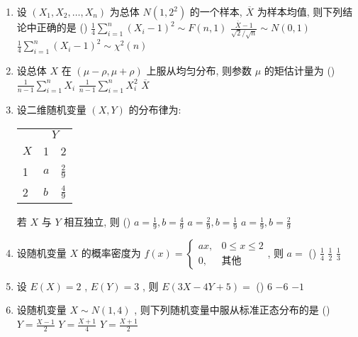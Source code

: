 \begin{enumerate}
	\item 设 $(X_1,X_2,\ldots,X_n)$ 为总体 $N\left(1,2^2\right)$ 的一个样本, $\overline X$ 为样本均值, 则下列结论中正确的是 (\hspace{1pc})
	{$\frac{1}{4}\sum_{i=1}^{n}(X_i-1)^2\sim F(n,1)$}
	{$\frac{\overline{X}-1}{\sqrt{2}/\sqrt{n}}\sim N(0,1)$}
	{$\frac{1}{4}\sum_{i=1}^{n}(X_i-1)^2\sim\chi^2(n)$}

	\item 设总体 $X$ 在 $(\mu-\rho,\mu+\rho)$ 上服从均匀分布, 则参数 $\mu$ 的矩估计量为 (\hspace{1pc})
	{$\frac{1}{n-1}\sum_{i=1}^{n}X_i$}
	{$\frac{1}{n-1}\sum_{i=1}^{n}X_i^2$}
	{$\overline{X}$}

	\item 设二维随机变量 $(X,Y)$ 的分布律为:
	\begin{center}
		\begin{tabularx}{0.8\textwidth}{ZZZ}
			\hline
			 & \\
			$X$ & 1 & 2\\
			 & $a$ & $\frac{2}{9}$\\
			 & $b$ & $\frac{4}{9}$\\
			\hline
		\end{tabularx}
	\end{center}
	若 $X$ 与 $Y$ 相互独立, 则 (\hspace{1pc})
	{$a=\frac{1}{9}, b=\frac{4}{9}$}
	{$a=\frac{2}{9}, b=\frac{1}{9}$}
	{$a=\frac{1}{9}, b=\frac{2}{9}$}

	\item 设随机变量 $X$ 的概率密度为 $f(x)=
	\begin{cases}
	ax, & 0\leq x\leq 2\\
	0, & \text{其他}
	\end{cases}
	$, 则 $a=$ (\hspace{1pc})
	{$\frac{1}{4}$}
	{$\frac{1}{2}$}
	{$\frac{1}{3}$}

	\item 设 $E(X)=2$ , $E(Y)=3$ , 则 $E(3X-4Y+5)=$ (\hspace{1pc})
	{6}
	{$-6$}
	{$-1$}

	\item 设随机变量 $X\sim N(1,4)$ , 则下列随机变量中服从标准正态分布的是 (\hspace{1pc})
	{$Y=\frac{X-1}{2}$}
	{$Y=\frac{X+1}{4}$}
	{$Y=\frac{X+1}{2}$}


\end{enumerate}
